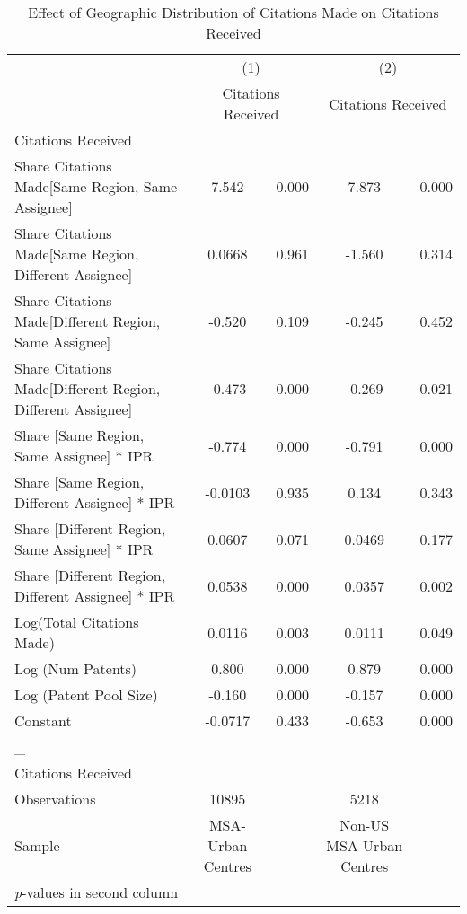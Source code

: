 {
\begin{longtable}{l*{2}{cc}}
\caption{Effect of Geographic Distribution of Citations Made on Citations Received \label{model34}}\\
\hline\hline\endfirsthead\hline\endhead\hline\endfoot\endlastfoot
                &\multicolumn{2}{c}{(1)}&\multicolumn{2}{c}{(2)}\\
                &\multicolumn{2}{c}{Citations Received}&\multicolumn{2}{c}{Citations Received}\\
\hline
Citations Received&         &         &         &         \\
Share Citations Made[Same Region, Same Assignee]&    7.542&    0.000&    7.873&    0.000\\
Share Citations Made[Same Region, Different Assignee]&   0.0668&    0.961&   -1.560&    0.314\\
Share Citations Made[Different Region, Same Assignee]&   -0.520&    0.109&   -0.245&    0.452\\
Share Citations Made[Different Region, Different Assignee]&   -0.473&    0.000&   -0.269&    0.021\\
Share [Same Region, Same Assignee] * IPR&   -0.774&    0.000&   -0.791&    0.000\\
Share [Same Region, Different Assignee] * IPR&  -0.0103&    0.935&    0.134&    0.343\\
Share [Different Region, Same Assignee] * IPR&   0.0607&    0.071&   0.0469&    0.177\\
Share [Different Region, Different Assignee] * IPR&   0.0538&    0.000&   0.0357&    0.002\\
Log(Total Citations Made)&   0.0116&    0.003&   0.0111&    0.049\\
Log (Num Patents)&    0.800&    0.000&    0.879&    0.000\\
Log (Patent Pool Size)&   -0.160&    0.000&   -0.157&    0.000\\
Constant        &  -0.0717&    0.433&   -0.653&    0.000\\
\hline
\_               &         &         &         &         \\
Citations Received&         &         &         &         \\
\hline
Observations    &    10895&         &     5218&         \\
Sample          &MSA-Urban Centres&         &Non-US MSA-Urban Centres&         \\
\hline\hline
\multicolumn{5}{l}{\footnotesize \textit{p}-values in second column}\\
\end{longtable}
}

